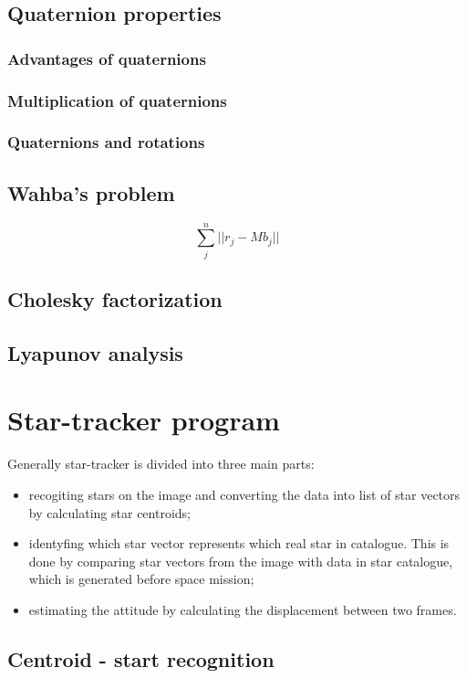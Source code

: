 \documentclass[12pt,a4paper,oneside]{article}
\begin{document}
\subsection{Quaternion properties}
\subsubsection{Advantages of quaternions}
\subsubsection{Multiplication of quaternions}
\subsubsection{Quaternions and rotations}
\subsection{Wahba's problem}
\cite{wahba1965least}

\begin{equation}
\sum_j^n ||r_j - Mb_j||
\end{equation}
\subsection{Cholesky factorization}
\subsection{Lyapunov analysis}

\newpage
\section{Star-tracker program}
\cite{ju2003overview}\par
Generally star-tracker is divided into three main parts\cite{6187242}:
\begin{itemize}
\item recogiting stars on the image and converting the data into list of star vectors by calculating star centroids;
\item identyfing which star vector represents which real star in catalogue. This is done by comparing star vectors from the image with data in star catalogue, which is generated before space mission;
\item estimating the attitude by calculating the displacement between two frames.
\end{itemize}
\subsection{Centroid - start recognition}
\cite{samaan2002predictive}
\end{document}
